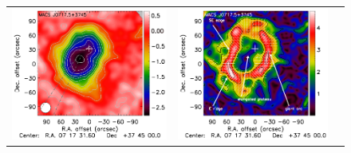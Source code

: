 \documentclass[traditabstract]{aa}
\begin{document}
\begin{figure}[p]
{\begin{tabular}{lll}
\includegraphics[trim=0cm 2.2cm 0cm 0cm, clip=true, scale=1]{Figure/Map_MACSJ0717.pdf} & 
\includegraphics[trim=2.3cm 2.2cm 0cm 0cm, clip=true, scale=1]{Figure/Grad_MACSJ0717_15_15_45.pdf} & 

\end{tabular}}
\end{figure}
\end{document}
